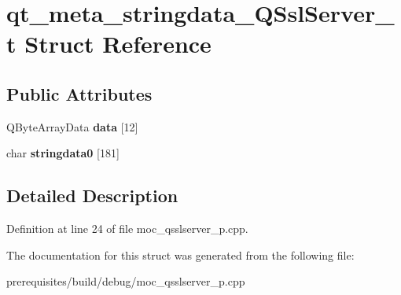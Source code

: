 \hypertarget{structqt__meta__stringdata___q_ssl_server__t}{}\section{qt\+\_\+meta\+\_\+stringdata\+\_\+\+Q\+Ssl\+Server\+\_\+t Struct Reference}
\label{structqt__meta__stringdata___q_ssl_server__t}
\subsection*{Public Attributes}
\begin{DoxyCompactItemize}
\item 
\mbox{\label{structqt__meta__stringdata___q_ssl_server__t_a09a8b2f72b16c4e0583107681f0722ac}} 
Q\+Byte\+Array\+Data {\bfseries data} \mbox{[}12\mbox{]}
\item 
\mbox{\label{structqt__meta__stringdata___q_ssl_server__t_a0fd50ade82d4e96c8ec675567333c66a}} 
char {\bfseries stringdata0} \mbox{[}181\mbox{]}
\end{DoxyCompactItemize}


\subsection{Detailed Description}


Definition at line 24 of file moc\+\_\+qsslserver\+\_\+p.\+cpp.



The documentation for this struct was generated from the following file\+:\begin{DoxyCompactItemize}
\item 
prerequisites/build/debug/moc\+\_\+qsslserver\+\_\+p.\+cpp\end{DoxyCompactItemize}
